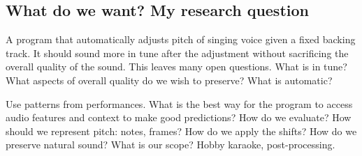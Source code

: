 \subsection{What do we want? My research question} A program that automatically adjusts pitch of singing voice given a fixed backing track. It should sound more in tune after the adjustment without sacrificing the overall quality of the sound. This leaves many open questions. What is in tune? What aspects of overall quality do we wish to preserve? What is automatic?

Use patterns from performances. What is the best way for the program to access audio features and context to make good predictions? How do we evaluate? How should we represent pitch: notes, frames? How do we apply the shifts? How do we preserve natural sound? What is our scope? Hobby karaoke, post-processing.

